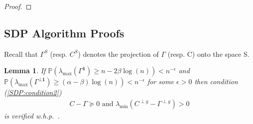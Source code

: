 \documentclass[english]{article}
\newtheorem{lemma}{Lemma}
\newcommand{\1}{\textbf{1}}
\newcommand{\p}{\mathbb{P}}
\begin{document}
\begin{proof}
\end{proof}






\subsection{SDP Algorithm Proofs}



Recall that $\Gamma^S$ (resp. $C^S$) denotes the projection of $\Gamma$ (resp. C) onto the space S.

\begin{lemma} \label{lemma:lemma2SDP}
If $\p\left(\lambda_{\max}(\Gamma^\1) \geq n-2\beta\log(n)\right)<n^{-\epsilon}$ and $\p\left(\lambda_{\max}(\Gamma^{\perp \1}) \geq (\alpha-\beta) \log(n)\right)< n^{-\epsilon}$ for some $\epsilon>0$ then condition (\ref{SDP:condition2})
\begin{align*}
C-\Gamma \succeq 0 \text{ and } \lambda_{\min}\left( C^{\perp g}-\Gamma^{\perp g}\right)>0
\end{align*}
is verified w.h.p.\ .
\end{lemma}
\end{document}
